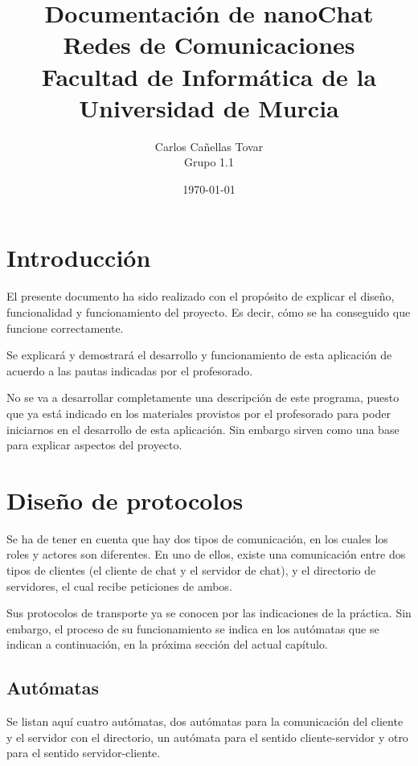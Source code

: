 \documentclass{article}
\title{Documentación de nanoChat \\
	\large Redes de Comunicaciones \\
	\small Facultad de Informática de la Universidad de Murcia
}
\author{Carlos Cañellas Tovar \\
	\small Grupo 1.1
}
\date{\today}
\begin{document}
\maketitle

\newpage

\tableofcontents{}

\newpage

\section{Introducción}

El presente documento ha sido realizado con el propósito de explicar el diseño, funcionalidad y funcionamiento del proyecto. Es decir, cómo se ha conseguido que funcione correctamente.

Se explicará y demostrará el desarrollo y funcionamiento de esta aplicación de acuerdo a las pautas indicadas por el profesorado.

No se va a desarrollar completamente una descripción de este programa, puesto que ya está indicado en los materiales provistos por el profesorado para poder iniciarnos en el desarrollo de esta aplicación. Sin embargo sirven como una base para explicar aspectos del proyecto.

\newpage

\section{Diseño de protocolos}

Se ha de tener en cuenta que hay dos tipos de comunicación, en los cuales los roles y actores son diferentes. En uno de ellos, existe una comunicación entre dos tipos de clientes (el cliente de chat y el servidor de chat), y el directorio de servidores, el cual recibe peticiones de ambos. 

Sus protocolos de transporte ya se conocen por las indicaciones de la práctica. Sin embargo, el proceso de su funcionamiento se indica en los autómatas que se indican a continuación, en la próxima sección del actual capítulo.




\subsection{Autómatas}

Se listan aquí cuatro autómatas, dos autómatas para la comunicación del cliente y el servidor con el directorio, un autómata para el sentido cliente-servidor y otro para el sentido servidor-cliente.
\end{document}

